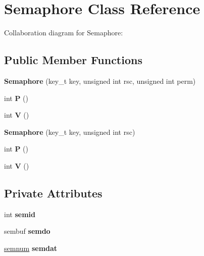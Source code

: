 \hypertarget{classSemaphore}{}\section{Semaphore Class Reference}
\label{classSemaphore}


Collaboration diagram for Semaphore\+:
\subsection*{Public Member Functions}
\begin{DoxyCompactItemize}
\item 
{\bfseries Semaphore} (key\+\_\+t key, unsigned int rsc, unsigned int perm)\hypertarget{classSemaphore_aead43382ae179e0182690d3f1cfbf0bf}{}\label{classSemaphore_aead43382ae179e0182690d3f1cfbf0bf}

\item 
int {\bfseries P} ()\hypertarget{classSemaphore_a038b9e5dc69b2d038cce8877bb006190}{}\label{classSemaphore_a038b9e5dc69b2d038cce8877bb006190}

\item 
int {\bfseries V} ()\hypertarget{classSemaphore_ab15e02c51825302a9eb519d96d8d8ad1}{}\label{classSemaphore_ab15e02c51825302a9eb519d96d8d8ad1}

\item 
{\bfseries Semaphore} (key\+\_\+t key, unsigned int rsc)\hypertarget{classSemaphore_a2c2790f444a301839d4a1ee7118af93e}{}\label{classSemaphore_a2c2790f444a301839d4a1ee7118af93e}

\item 
int {\bfseries P} ()\hypertarget{classSemaphore_a038b9e5dc69b2d038cce8877bb006190}{}\label{classSemaphore_a038b9e5dc69b2d038cce8877bb006190}

\item 
int {\bfseries V} ()\hypertarget{classSemaphore_ab15e02c51825302a9eb519d96d8d8ad1}{}\label{classSemaphore_ab15e02c51825302a9eb519d96d8d8ad1}

\end{DoxyCompactItemize}
\subsection*{Private Attributes}
\begin{DoxyCompactItemize}
\item 
int {\bfseries semid}\hypertarget{classSemaphore_ace6c48100e9652ee731b5fb3f956a554}{}\label{classSemaphore_ace6c48100e9652ee731b5fb3f956a554}

\item 
sembuf {\bfseries semdo}\hypertarget{classSemaphore_ad6dc79617da570c1db441485cd0f0864}{}\label{classSemaphore_ad6dc79617da570c1db441485cd0f0864}

\item 
\hyperlink{unionsemnum}{semnum} {\bfseries semdat}\hypertarget{classSemaphore_af42f920a971b8a14756449433abb4b34}{}\label{classSemaphore_af42f920a971b8a14756449433abb4b34}

\end{DoxyCompactItemize}


